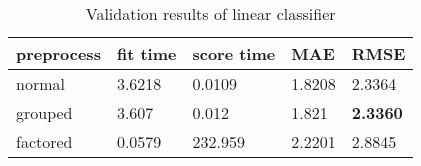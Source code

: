\begin{table}[H]
    \centering
    \begin{tabular}{l|llll}
    \toprule
    \textbf{preprocess} & \textbf{fit time} & \textbf{score time} & \textbf{MAE} & \textbf{RMSE} \\ \midrule
    normal  & 3.6218 & 0.0109  & 1.8208 & 2.3364          \\
    grouped & 3.607  & 0.012   & 1.821  & \textbf{2.3360} \\
    factored & 0.0579 & 232.959 & 2.2201 & 2.8845         \\
    \bottomrule       
    \end{tabular}
    \caption{Validation results of linear classifier}
    \label{tab:val_linear}
    \end{table}
